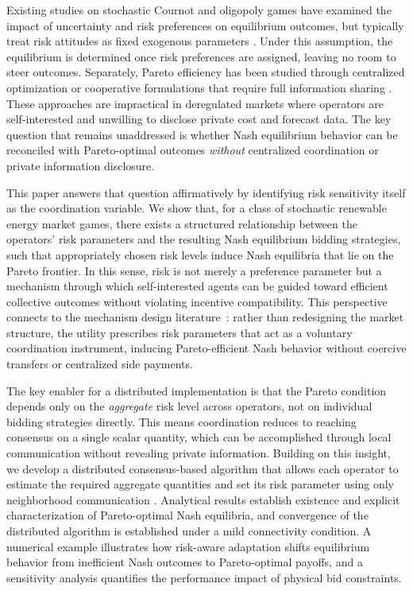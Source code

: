 \documentclass[conference]{IEEEtran}
\begin{document}
Existing studies on stochastic Cournot and oligopoly games have examined the impact of uncertainty and risk preferences on equilibrium outcomes,
but typically treat risk attitudes as fixed exogenous parameters \cite{cheng2002bertrand, sakai1989risk, gulpinar2014analysis}.
Under this assumption, the equilibrium is determined once risk preferences are assigned, leaving no room to steer outcomes.
Separately, Pareto efficiency has been studied through centralized optimization or cooperative formulations that require full information sharing
\cite{hobbs2001individual, zhao2010social, su2018integrated}.
These approaches are impractical in deregulated markets where operators are self-interested and unwilling to disclose private cost and forecast data.
The key question that remains unaddressed is whether Nash equilibrium behavior can be reconciled with Pareto-optimal outcomes
\emph{without} centralized coordination or private information disclosure.

This paper answers that question affirmatively by identifying risk sensitivity itself as the coordination variable.
We show that, for a class of stochastic renewable energy market games, there exists a structured relationship between the operators'
risk parameters and the resulting Nash equilibrium bidding strategies, such that appropriately chosen risk levels induce Nash equilibria
that lie on the Pareto frontier.
In this sense, risk is not merely a preference parameter but a mechanism through which self-interested agents can be guided
toward efficient collective outcomes without violating incentive compatibility.
This perspective connects to the mechanism design literature~\cite{hurwicz1960optimality,myerson1979incentive}: rather than redesigning the market structure, the utility prescribes risk parameters that act as a voluntary coordination instrument, inducing Pareto-efficient Nash behavior without coercive transfers or centralized side payments.

The key enabler for a distributed implementation is that the Pareto condition depends only on the \emph{aggregate} risk level
across operators, not on individual bidding strategies directly.
This means coordination reduces to reaching consensus on a single scalar quantity,
which can be accomplished through local communication without revealing private information.
Building on this insight, we develop a distributed consensus-based algorithm that allows each operator to estimate the required
aggregate quantities and set its risk parameter using only neighborhood communication \cite{molzahn2017survey, yang2019survey}.
Analytical results establish existence and explicit characterization of Pareto-optimal Nash equilibria,
and convergence of the distributed algorithm is established under a mild connectivity condition.
A numerical example illustrates how risk-aware adaptation shifts equilibrium behavior from inefficient Nash outcomes to Pareto-optimal payoffs,
and a sensitivity analysis quantifies the performance impact of physical bid constraints.
\end{document}
